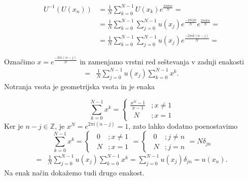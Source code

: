 \documentclass[mat2, tisk]{fmfdelo}
\newcommand{\Z}{\mathbb Z}
\begin{document}
\begin{dokaz}
\begin{align*}
  U^{-1}(U(x_n)) &= \frac{1}{N}\sum_{k=0}^{N-1} U(x_k) e^{\frac{2\pi k n i}{N}} = \\
  &= \frac{1}{N}\sum_{k=0}^{N-1} \sum_{j=0}^{N-1} u(x_j) e^{\frac{-2\pi i j k}{N}} e^{\frac{2\pi i k n }{N}} = \\
  &= \frac{1}{N}\sum_{k=0}^{N-1} \sum_{j=0}^{N-1} u(x_j) e^{\frac{-2\pi i k(n - j)}{N}} = 
\end{align*}

Označimo $x = e^{\frac{-2\pi i (n-j)}{N}}$ in zamenjamo vrstni red seštevanja v 
zadnji enakosti 
\begin{align*}
=& \frac{1}{N}\sum_{j=0}^{N-1} u(x_j)\sum_{k=0}^{N-1} x^k .
\end{align*}
Notranja vsota je geometrijska vsota in je enaka

\[ 
  \sum_{k=0}^{N-1} x^k = \begin{cases} 
      \frac{x^N - 1}{x - 1} &; x\neq 1 \\
      \,\,\,N &; x = 1 
   \end{cases}
\]
Ker je $n-j \in \Z$, je $x^N = e^{2\pi i(n-j)} = 1$, zato lahko dodatno
poenostavimo  
\[ 
  \sum_{k=0}^{N-1} x^k = \begin{cases} 
      \,\,\,0 &; x\neq 1 \\
      \,\,\,N &; x = 1 
   \end{cases}
   = 
   \begin{cases} 
    \,\,\,0 &; j\neq n \\
    \,\,\,N &; j=n 
 \end{cases}
 = N\delta_{jn}
\]
\begin{align*}
  =& \frac{1}{N}\sum_{j=0}^{N-1} u(x_j)\sum_{k=0}^{N-1} x^k = \sum_{j=0}^{N-1} u(x_j) \delta_{jn} = u(x_n). 
\end{align*}
Na enak način dokažemo tudi drugo enakost.
\end{dokaz}
\end{document}
